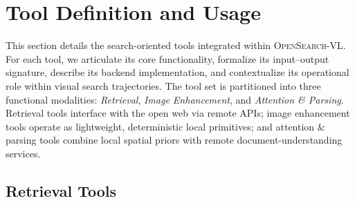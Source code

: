 \FloatBarrier

\section{Tool Definition and Usage}
\label{apdx:tool-definition}

This section details the search-oriented tools integrated within \textsc{OpenSearch-VL}. For each tool, we articulate its core functionality, formalize its input--output signature, describe its backend implementation, and contextualize its operational role within visual search trajectories. The tool set is partitioned into three functional modalities: \emph{Retrieval}, \emph{Image Enhancement}, and \emph{Attention \& Parsing}. Retrieval tools interface with the open web via remote APIs; image enhancement tools operate as lightweight, deterministic local primitives; and attention \& parsing tools combine local spatial priors with remote document-understanding services.

\subsection*{Retrieval Tools}


